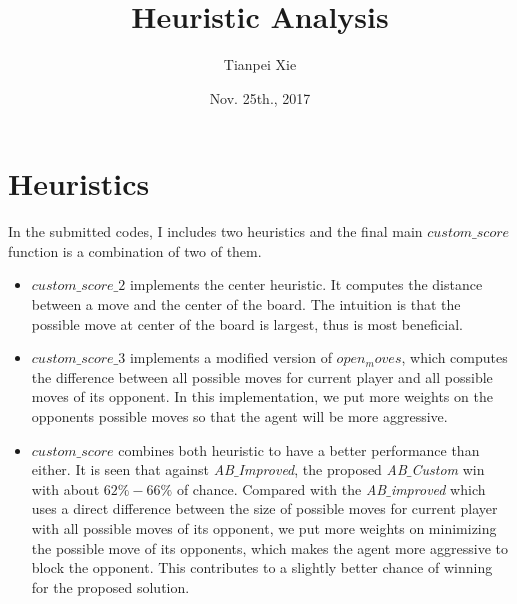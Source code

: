 \documentclass[11pt]{article}
\begin{document}
\title{Heuristic Analysis}
\author{ Tianpei Xie}
\date{ Nov. 25th., 2017 }
\maketitle
\section{Heuristics}
In the submitted codes, I includes two heuristics  and the final main $custom\_score$ function is a combination of two of them.

\begin{itemize}
\item $custom\_score\_2$ implements the center heuristic. It computes the distance between a move and the center of the board. The intuition is that the possible move at center of the board is largest, thus is most beneficial. 

\item $custom\_score\_3$ implements a modified version of $open_moves$, which computes the difference between all possible moves for current player and all possible moves of its opponent. In this implementation, we put more weights on the opponents possible moves so that  the agent will be more aggressive. 

\item $custom\_score$ combines both heuristic to have a better performance than either.  It is seen that against \emph{AB$\_$Improved}, the proposed \emph{AB$\_$Custom} win with about $62\% - 66\%$ of chance. Compared with the\emph{ AB$\_$improved } which uses a direct difference between the size of possible moves for current player with all possible moves of its opponent, we put more weights on minimizing the possible move of its opponents, which makes the agent more aggressive to block the opponent. This contributes to a slightly better chance of winning for the proposed solution. 


\end{itemize}
\end{document}
